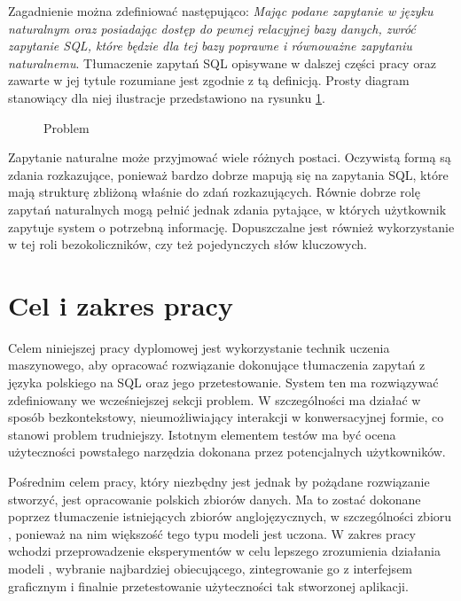 Zagadnienie  można zdefiniować następująco: \textit{Mając podane zapytanie w języku naturalnym oraz posiadając dostęp do pewnej relacyjnej bazy danych, zwróć zapytanie SQL, które będzie dla tej bazy poprawne i równoważne zapytaniu naturalnemu}. Tłumaczenie zapytań SQL opisywane w dalszej części pracy oraz zawarte w jej tytule rozumiane jest zgodnie z tą definicją. Prosty diagram stanowiący dla niej ilustracje przedstawiono na rysunku \ref{fig:text-to-sql}.

\begin{figure}[ht!]
  \centering
  
  \caption{Problem }
  \label{fig:text-to-sql}
\end{figure}

Zapytanie naturalne może przyjmować wiele różnych postaci. Oczywistą formą są zdania rozkazujące, ponieważ bardzo dobrze mapują się na zapytania SQL, które mają strukturę zbliżoną właśnie do zdań rozkazujących. Równie dobrze rolę zapytań naturalnych mogą pełnić jednak zdania pytające, w których użytkownik zapytuje system o potrzebną informację. Dopuszczalne jest również wykorzystanie w tej roli bezokoliczników, czy też pojedynczych słów kluczowych.

\section{Cel i zakres pracy}
Celem niniejszej pracy dyplomowej jest wykorzystanie technik uczenia maszynowego, aby opracować rozwiązanie dokonujące tłumaczenia zapytań z języka polskiego na SQL oraz jego przetestowanie. System ten ma rozwiązywać zdefiniowany we wcześniejszej sekcji problem. W szczególności ma działać w sposób bezkontekstowy, nieumożliwiający interakcji w konwersacyjnej formie, co stanowi problem trudniejszy. Istotnym elementem testów ma być ocena użyteczności powstałego narzędzia dokonana przez potencjalnych użytkowników.

Pośrednim celem pracy, który niezbędny jest jednak by pożądane rozwiązanie stworzyć, jest opracowanie polskich zbiorów danych. Ma to zostać dokonane poprzez tłumaczenie istniejących zbiorów anglojęzycznych, w szczególności zbioru , ponieważ na nim większość tego typu modeli jest uczona. W zakres pracy wchodzi przeprowadzenie eksperymentów w celu lepszego zrozumienia działania modeli , wybranie najbardziej obiecującego, zintegrowanie go z interfejsem graficznym i finalnie przetestowanie użyteczności tak stworzonej aplikacji.

